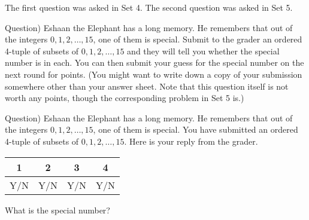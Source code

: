 The first question was asked in Set 4. The second question was asked in Set 5.

Question) Eshaan the Elephant has a long memory. He remembers that out of the integers $0, 1, 2, \dots, 15$, one of them is special. Submit to the grader an ordered 4-tuple of subsets of $0, 1, 2, \dots, 15$ and they will tell you whether the special number is in each. You can then submit your guess for the special number on the next round for points. (You might want to write down a copy of your submission somewhere other than your answer sheet. Note that this question itself is not worth any points, though the corresponding problem in Set 5 is.)

Question) Eshaan the Elephant has a long memory. He remembers that out of the integers $0, 1, 2, \dots, 15$, one of them is special. You have submitted an ordered 4-tuple of subsets of $0, 1, 2, \dots, 15$. Here is your reply from the grader.
    \begin{tabular}{|c|c|c|c|}
    \hline
        1 & 2 & 3 & 4 \\ \hline
        Y/N & Y/N & Y/N & Y/N \\ \hline
    \end{tabular}
    What is the special number?